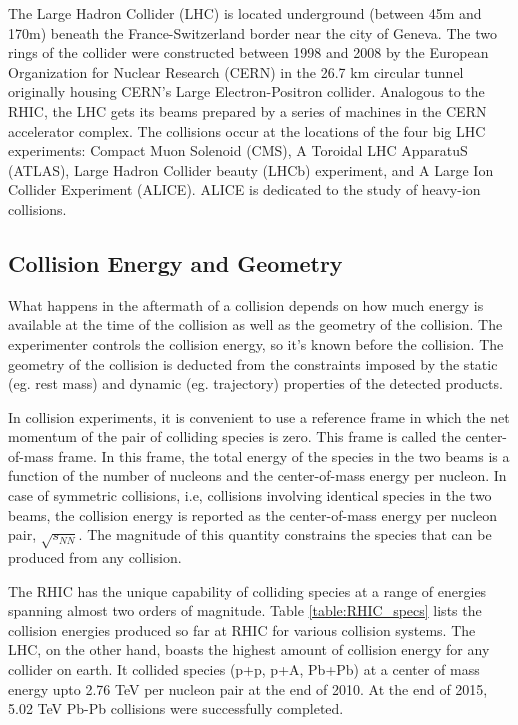 The Large Hadron Collider (LHC) is located underground (between 45m and 170m) beneath the France-Switzerland border near the city of  Geneva. The two rings of the collider were constructed between 1998 and 2008 by the European Organization for Nuclear Research (CERN) in the 26.7 km circular tunnel originally housing CERN's Large Electron-Positron collider. Analogous to the RHIC, the LHC gets its beams prepared by a series of machines in the CERN accelerator complex. The collisions occur at the locations of the four big LHC experiments: Compact Muon Solenoid (CMS), A Toroidal LHC ApparatuS (ATLAS), Large Hadron Collider beauty (LHCb) experiment, and A Large Ion Collider Experiment (ALICE). ALICE is dedicated to the study of heavy-ion collisions. \cite{1748-0221-3-08-S08001}

\subsection{Collision Energy and Geometry}
What happens in the aftermath of a collision depends on how much energy is available at the time of the collision as well as the geometry of the collision. The experimenter controls the collision energy, so it's known before the collision. The geometry of the collision is deducted from the constraints imposed by the static (eg. rest mass) and dynamic (eg. trajectory) properties of the detected products.

In collision experiments, it is convenient to use a reference frame in which the net momentum of the pair of colliding species is zero. This frame is called the center-of-mass frame. In this frame, the total energy of the species in the two beams is a function of the number of nucleons and the center-of-mass energy per nucleon. In case of symmetric collisions, i.e, collisions involving identical species in the two beams, the collision energy is reported as the center-of-mass energy per nucleon pair, $\sqrt{s_{NN}}$. The magnitude of this quantity constrains the species that can be produced from any collision.


The RHIC has the unique capability of colliding species at a range of energies spanning almost two orders of magnitude. Table \ref{table:RHIC_specs} lists the collision energies produced so far at RHIC for various collision systems. The LHC, on the other hand, boasts the highest amount of collision energy for any collider on earth. It collided species (p+p, p+A, Pb+Pb) at a center of mass energy upto 2.76 TeV per nucleon pair at the end of 2010. At the end of 2015, 5.02 TeV Pb-Pb collisions were successfully completed. \cite{FOKA2016154}

